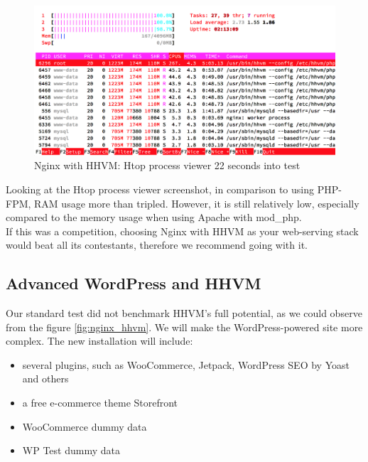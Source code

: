 \begin{figure}[H]
\begin{center}
\includegraphics[scale=0.5]{figures/Nginx_HHVM_24s.png}
\caption{Nginx with HHVM: Htop process viewer 22 seconds into test}
\label{fig:nginx_hhvm_24s}
\end{center}
\end{figure}

Looking at the Htop process viewer screenshot, in comparison to using PHP-FPM, RAM usage more than tripled. However, it is still relatively low, especially compared to the memory usage when using Apache with mod\_php. \\

If this was a competition, choosing Nginx with HHVM as your web-serving stack would beat all its contestants, therefore we recommend going with it.

\subsection{Advanced WordPress and HHVM} \label{advanced-wordpress-hhvm}

Our standard test did not benchmark HHVM's full potential, as we could observe from the figure \ref{fig:nginx_hhvm}. We will make the WordPress-powered site more complex. The new installation will include:

\begin{itemize}
	\item several plugins, such as WooCommerce, Jetpack, WordPress SEO by Yoast and others \cite{WP_Ansible:group_vars}
	\item a free e-commerce theme Storefront \cite{WP:Storefront}
	\item WooCommerce \gls{dummy data}
	\item WP Test dummy data \cite{WP:WP_Test-dummy-data}
\end{itemize}

